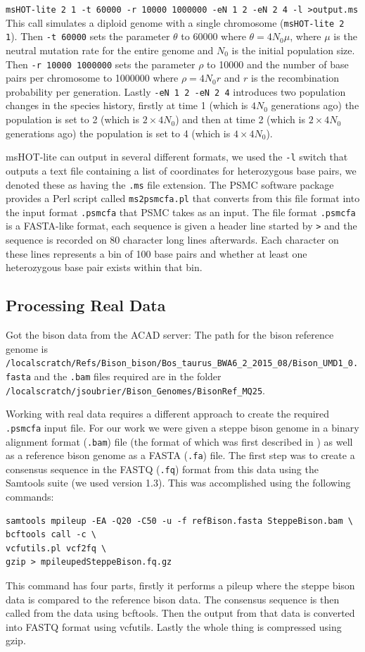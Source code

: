 \documentclass[11pt,a4paper]{article}
\begin{document}
\verb|msHOT-lite 2 1 -t 60000 -r 10000 1000000 -eN 1 2 -eN 2 4 -l >output.ms| 
This call simulates a diploid genome with a single chromosome (\verb|msHOT-lite 2 1|). Then \verb|-t 60000| sets the parameter $\theta$ to 60000 where $\theta=4N_0\mu$, where $\mu$ is the neutral mutation rate for the entire genome and $N_0$ is the initial population size. Then \verb|-r 10000 1000000| sets the parameter $\rho$ to 10000 and the number of base pairs per chromosome to 1000000 where $\rho=4N_0r$ and $r$ is the recombination probability per generation. Lastly \verb|-eN 1 2 -eN 2 4| introduces two population changes in the species history, firstly at time 1 (which is $4N_0$ generations ago) the population is set to 2 (which is $2\times4N_0$) and then at time 2 (which is $2\times4N_0$ generations ago) the population is set to 4 (which is $4\times4N_0$).

msHOT-lite can output in several different formats, we used the \verb|-l| switch that outputs a text file containing a list of coordinates for heterozygous base pairs, we denoted these as having the \verb|.ms| file extension. The PSMC software package \cite{li2011inference} provides a Perl script called \verb|ms2psmcfa.pl| that converts from this file format into the input format \verb|.psmcfa| that PSMC takes as an input. The file format \verb|.psmcfa| is a FASTA-like format, each sequence is given a header line started by \verb|>| and the sequence is recorded on 80 character long lines afterwards. Each character on these lines represents a bin of 100 base pairs and whether at least one heterozygous base pair exists within that bin.

\subsection{Processing Real Data}
Got the bison data from the ACAD server: The path for the bison reference genome is \verb|/localscratch/Refs/Bison_bison/Bos_taurus_BWA6_2_2015_08/Bison_UMD1_0.fasta| and the \verb|.bam| files required are in the folder \verb|/localscratch/jsoubrier/Bison_Genomes/BisonRef_MQ25|.

Working with real data requires a different approach to create the required \verb|.psmcfa| input file. For our work we were given a steppe bison genome in a binary alignment format (\verb|.bam|) file (the format of which was first described in \cite{li2009sequence}) as well as a reference bison genome as a FASTA (\verb|.fa|) file. The first step was to create a consensus sequence in the FASTQ (\verb|.fq|) format from this data using the Samtools suite (we used version 1.3). This was accomplished using the following commands:
\begin{verbatim}
samtools mpileup -EA -Q20 -C50 -u -f refBison.fasta SteppeBison.bam \ 
bcftools call -c \
vcfutils.pl vcf2fq \
gzip > mpileupedSteppeBison.fq.gz
\end{verbatim}
This command has four parts, firstly it performs a pileup where the steppe bison data is compared to the reference bison data. The consensus sequence is then called from the data using bcftools. Then the output from that data is converted into FASTQ format using vcfutils. Lastly the whole thing is compressed using gzip. 
\end{document}
